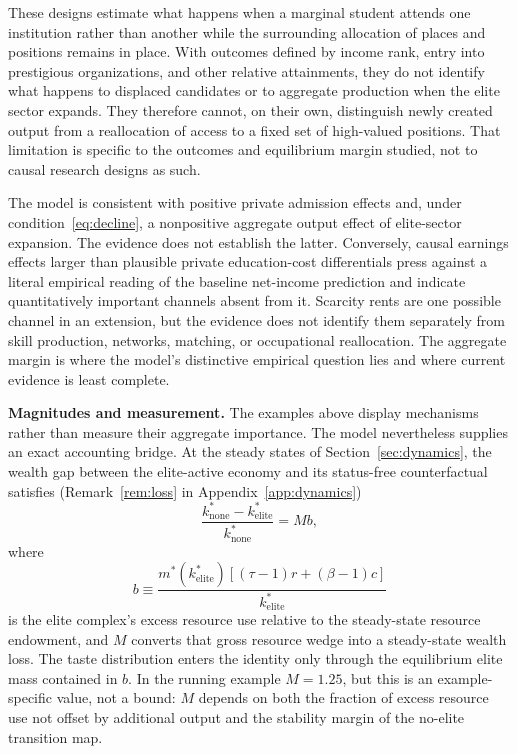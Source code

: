 \documentclass[12pt,letterpaper]{article}
\theoremstyle{definition}
\begin{document}
These designs estimate what happens when a marginal student attends one institution rather than another while the surrounding allocation of places and positions remains in place.
With outcomes defined by income rank, entry into prestigious organizations, and other relative attainments, they do not identify what happens to displaced candidates or to aggregate production when the elite sector expands.
They therefore cannot, on their own, distinguish newly created output from a reallocation of access to a fixed set of high-valued positions.
That limitation is specific to the outcomes and equilibrium margin studied, not to causal research designs as such.

The model is consistent with positive private admission effects and, under condition~\eqref{eq:decline}, a nonpositive aggregate output effect of elite-sector expansion.
The evidence does not establish the latter.
Conversely, causal earnings effects larger than plausible private education-cost differentials press against a literal empirical reading of the baseline net-income prediction and indicate quantitatively important channels absent from it.
Scarcity rents are one possible channel in an extension, but the evidence does not identify them separately from skill production, networks, matching, or occupational reallocation.
The aggregate margin is where the model's distinctive empirical question lies and where current evidence is least complete.

\textbf{Magnitudes and measurement.}
The examples above display mechanisms rather than measure their aggregate importance.
The model nevertheless supplies an exact accounting bridge.
At the steady states of Section~\ref{sec:dynamics}, the wealth gap between the elite-active economy and its status-free counterfactual satisfies (Remark~\ref{rem:loss} in Appendix~\ref{app:dynamics})
\[
\frac{k^\ast_{\mathrm{none}}-k^\ast_{\mathrm{elite}}}
     {k^\ast_{\mathrm{none}}}
=
M b,
\]
where
\[
b
\equiv
\frac{
m^\ast(k^\ast_{\mathrm{elite}})
\left[(\tau-1)r+(\beta-1)c\right]
}{
k^\ast_{\mathrm{elite}}
}
\]
is the elite complex's excess resource use relative to the steady-state resource endowment, and $M$ converts that gross resource wedge into a steady-state wealth loss.
The taste distribution enters the identity only through the equilibrium elite mass contained in $b$.
In the running example $M=1.25$, but this is an example-specific value, not a bound: $M$ depends on both the fraction of excess resource use not offset by additional output and the stability margin of the no-elite transition map.
\end{document}
